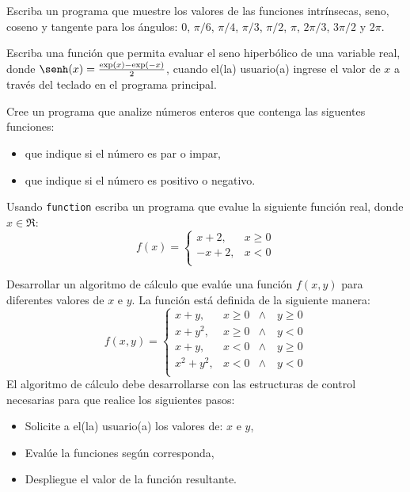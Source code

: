 \documentclass[11pt]{exam}
\begin{document}
\begin{questions}
\item Escriba un programa que muestre los valores de las funciones intr\'insecas, seno, coseno y tangente para los \'angulos: 0, $\pi /6$, $\pi /4$, $\pi /3$, $\pi /2$, $\pi$, $2\pi/3$, $3\pi /2$
y $2 \pi$.
\item Escriba una funci\'on que permita evaluar el seno hiperb\'olico de una variable real, donde $\senh(x)=\frac{\exp(x)-\exp(-x)} {2}$, cuando
el(la) usuario(a) ingrese el valor de $x$ a trav\'es del teclado en el programa principal.
\item Cree un programa que analize n\'umeros enteros que contenga las siguentes funciones:
\begin{itemize}
 \item que indique si el n\'umero es par o impar, 
\item  que indique si el n\'umero es positivo o negativo.

\end{itemize}

\item Usando \texttt{function} escriba un programa que evalue la siguiente  funci\'on real, donde $x\in \Re$:
\begin{equation}
f(x)=\left\lbrace 
\begin{array}{ll}
x+ 2, &  x \geq 0 \\
-x +2, & x < 0 \\
\end{array}\right.
\end{equation}
\item 
Desarrollar un algoritmo de c\'alculo que eval\'ue una funci\'on $f(x,y)$ para diferentes
valores de $x$ e $ y$. La funci\'on est\'a definida de la siguiente manera:
\begin{equation}
f(x,y)=\left\lbrace 
\begin{array}{lll}
x+ y, &  x \geq 0 & \wedge \quad  y \geq 0\\
x + y^{2}, & x \geq 0 & \wedge \quad y < 0\\
x +y, & x < 0 & \wedge \quad  y\geq0\\
x^{2}  + y^{2}, &  x < 0 & \wedge \quad y < 0\\
\end{array}\right.
\end{equation}
  El algoritmo de c\'alculo debe desarrollarse con las estructuras de control necesarias para
que realice los siguientes pasos:
\begin{itemize}
\item  Solicite a el(la) usuario(a) los valores de: $x$ e $y$,
\item Eval\'ue la funciones seg\'un corresponda,
\item Despliegue el valor de la funci\'on resultante.
\end{itemize}


\end{questions}
\end{document}
